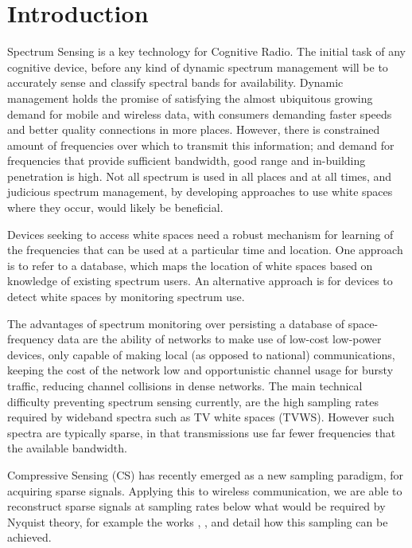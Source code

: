 \section{Introduction}

Spectrum Sensing is a key technology for Cognitive Radio. The initial task of any cognitive device, before any kind of dynamic spectrum management will be to accurately sense and classify spectral bands for availability. Dynamic management holds the promise of satisfying the almost ubiquitous growing demand for mobile and wireless data, with consumers demanding faster speeds and better quality connections in more places. However, there is constrained amount of frequencies over which to transmit this information; and demand for frequencies that provide sufficient bandwidth, good range and in-building penetration is high. Not all spectrum is used in all places and at all times, and judicious spectrum management, by developing approaches to use white spaces where they occur, would likely be beneficial.

Devices seeking to access white spaces need a robust mechanism for learning of the frequencies that can be used at a particular time and location. One approach is to refer to a database, which maps the location of white spaces based on knowledge of existing spectrum users. An alternative approach is for devices to detect white spaces by monitoring spectrum use. 

The advantages of spectrum monitoring \cite{akan2009cognitive} over persisting a database of space-frequency data are the ability of networks to make use of low-cost low-power devices, only capable of making local (as opposed to national) communications, keeping the cost of the network low and  opportunistic channel usage for bursty traffic, reducing channel collisions in dense networks. The main technical difficulty preventing spectrum sensing currently, are the high sampling rates required by wideband spectra such as TV white spaces (TVWS). However such spectra are typically sparse, in that transmissions use far fewer frequencies that the available bandwidth. 

Compressive Sensing (CS) \cite{Candes2006} has recently emerged as a new sampling paradigm, for acquiring sparse signals. Applying this to wireless communication, we are able to reconstruct sparse signals at sampling rates below what would be required by Nyquist theory, for example the works \cite{mishali2010theory}, \cite{polo2009compressive}, and \cite{tropp2010beyond} detail how this sampling can be achieved. 

